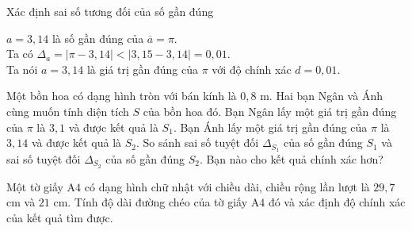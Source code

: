 \begin{dang}{Xác định sai số tương đối của số gần đúng}
\end{dang}
\viduminhhoa
\begin{vd}%
	$a=3{,}14$ là số gần đúng của $\overline{a}=\pi$.\\
	Ta có $\Delta_{a}=|\pi-3{,}14|<|3{,}15-3{,}14|=0{,}01$.\\
	Ta nói $a=3{,}14$ là giá trị gần đúng của $\pi$ với độ chính xác $d=0{,}01$.
\end{vd}
\begin{vd}%
	Một bồn hoa có dạng hình tròn với bán kính là $0{,}8$ m. Hai bạn Ngân và Ánh cùng muốn tính diện tích $S$ của bồn hoa đó. Bạn Ngân lấy một giá trị gần đúng của $\pi$ là $3{,}1$ và được kết quả là $S_1$. Bạn Ánh lấy một giá trị gần đúng của $\pi$ là $3{,}14$ và được kết quả là $S_2$. So sánh sai số tuyệt đối $\Delta_{S_1}$ của số gần đúng $S_1$ và sai số tuyệt đối $\Delta_{S_2}$ của số gần đúng $S_2$. Bạn nào cho kết quả chính xác hơn?
\end{vd}
\begin{vd}%
	Một tờ giấy A$4$ có dạng hình chữ nhật với chiều dài, chiều rộng lần lượt là $29{,}7$ cm và $21$ cm. Tính độ dài đường chéo của tờ giấy A$4$ đó và xác định độ chính xác của kết quả tìm được.
\end{vd}

